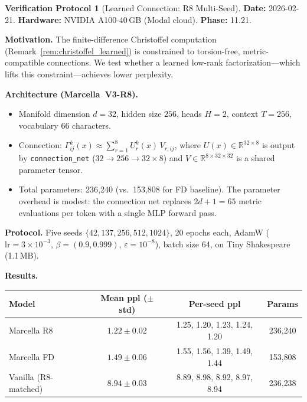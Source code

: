 \documentclass[11pt,a4paper]{article}
\theoremstyle{definition}
\newtheorem{protocol}[theorem]{Verification Protocol}
\theoremstyle{remark}
\newcommand{\R}{\mathbb{R}}
\begin{document}
\begin{protocol}[Learned Connection: R8 Multi-Seed]%
\label{prot:learned_connection}
\textbf{Date:} 2026-02-21.  \textbf{Hardware:} NVIDIA A100-40\,GB 
(Modal cloud).  \textbf{Phase:} 11.21.

\medskip
\textbf{Motivation.} The finite-difference Christoffel computation 
(Remark~\ref{rem:christoffel_learned}) is constrained to torsion-free, 
metric-compatible connections. We test whether a learned low-rank 
factorization---which lifts this constraint---achieves lower perplexity.

\medskip
\textbf{Architecture (Marcella~V3-R8).}
\begin{itemize}[nosep]
  \item Manifold dimension $d = 32$, hidden size $256$, heads $H = 2$, 
  context $T = 256$, vocabulary 66 characters.
  \item Connection: $\Gamma^k_{ij}(x) \approx \sum_{r=1}^{8} 
  U^k_r(x)\, V_{r,ij}$, where $U(x) \in \R^{32 \times 8}$ is output 
  by \texttt{connection\_net} ($32 \to 256 \to 32 \times 8$) and 
  $V \in \R^{8 \times 32 \times 32}$ is a shared parameter tensor.
  \item Total parameters: 236{,}240 (vs.\ 153{,}808 for FD baseline). 
  The parameter overhead is modest: the connection net replaces $2d+1 = 
  65$ metric evaluations per token with a single MLP forward pass.
\end{itemize}

\textbf{Protocol.} Five seeds $\{42, 137, 256, 512, 1024\}$, 
20 epochs each, AdamW ($\mathrm{lr} = 3 \times 10^{-3}$, 
$\beta = (0.9, 0.999)$, $\varepsilon = 10^{-8}$), 
batch size 64, on Tiny Shakespeare (1.1\,MB).

\medskip
\textbf{Results.}
\begin{center}
\begin{tabular}{lccc}
\toprule
Model & Mean ppl ($\pm$ std) & Per-seed ppl & Params \\
\midrule
Marcella R8 & $\mathbf{1.22 \pm 0.02}$ & 
  1.25, 1.20, 1.23, 1.24, 1.20 & 236{,}240 \\
Marcella FD & $1.49 \pm 0.06$ & 
  1.55, 1.56, 1.39, 1.49, 1.44 & 153{,}808 \\
Vanilla (R8-matched) & $8.94 \pm 0.03$ & 
  8.89, 8.98, 8.92, 8.97, 8.94 & 236{,}238 \\
\bottomrule
\end{tabular}
\end{center}


\end{protocol}
\end{document}
